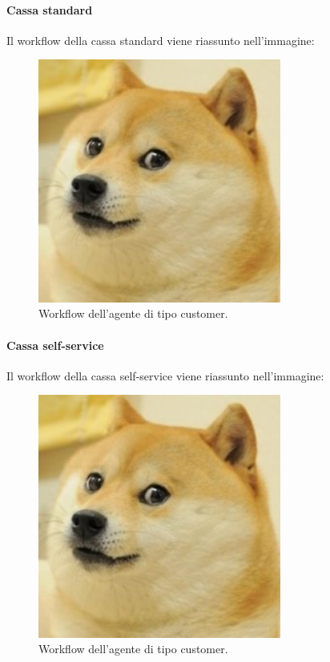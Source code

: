 \paragraph{Cassa standard}

Il workflow della cassa standard viene riassunto nell'immagine:

\begin{figure}[htp!]
	\centering
	\hspace*{3cm}
	\includegraphics[width=8cm]{"images/doggo.jpg"}
	\caption{Workflow dell'agente di tipo customer.}
	\label{fig:workflow_customer}
\end{figure}

\paragraph{Cassa self-service}

Il workflow della cassa self-service viene riassunto nell'immagine:

\begin{figure}[htp!]
	\centering
	\hspace*{3cm}
	\includegraphics[width=8cm]{"images/doggo.jpg"}
	\caption{Workflow dell'agente di tipo customer.}
	\label{fig:workflow_customer}
\end{figure}

